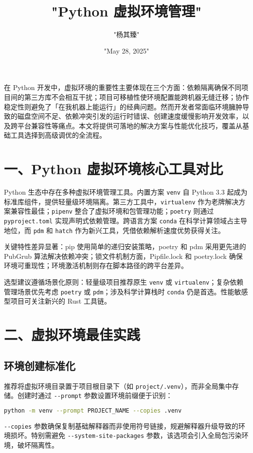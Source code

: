\title{"Python 虚拟环境管理"}
\author{"杨其臻"}
\date{"May 28, 2025"}
\maketitle
在 Python 开发中，虚拟环境的重要性主要体现在三个方面：依赖隔离确保不同项目间的第三方库不会相互干扰；项目可移植性使环境配置能跨机器无缝迁移；协作稳定性则避免了「在我机器上能运行」的经典问题。然而开发者常面临环境臃肿导致的磁盘空间不足、依赖冲突引发的运行时错误、创建速度缓慢影响开发效率，以及跨平台兼容性等痛点。本文将提供可落地的解决方案与性能优化技巧，覆盖从基础工具选择到高级调优的全流程。\par
\chapter{一、Python 虚拟环境核心工具对比}
Python 生态中存在多种虚拟环境管理工具。内置方案 \verb!venv! 自 Python 3.3 起成为标准库组件，提供轻量级环境隔离。第三方工具中，\verb!virtualenv! 作为老牌解决方案兼容性最佳；\verb!pipenv! 整合了虚拟环境和包管理功能；\verb!poetry! 则通过 \verb!pyproject.toml! 实现声明式依赖管理。跨语言方案 \verb!conda! 在科学计算领域占主导地位，而 \verb!pdm! 和 \verb!hatch! 作为新兴工具，凭借依赖解析速度优势获得关注。\par
关键特性差异显著：pip 使用简单的递归安装策略，poetry 和 pdm 采用更先进的 PubGrub 算法解决依赖冲突；锁文件机制方面，Pipfile.lock 和 poetry.lock 确保环境可重现性；环境激活机制则存在脚本路径的跨平台差异。\par
选型建议遵循场景化原则：轻量级项目推荐原生 \verb!venv! 或 \verb!virtualenv!；复杂依赖管理场景优先考虑 \verb!poetry! 或 \verb!pdm!；涉及科学计算栈时 \verb!conda! 仍是首选。性能敏感型项目可关注新兴的 Rust 工具链。\par
\chapter{二、虚拟环境最佳实践}
\section{环境创建标准化}
推荐将虚拟环境目录置于项目根目录下（如 \verb!project/.venv!），而非全局集中存储。创建时通过 \verb!--prompt! 参数设置环境前缀便于识别：\par
\begin{lstlisting}[language=bash]
python -m venv --prompt PROJECT_NAME --copies .venv
\end{lstlisting}
\verb!--copies! 参数确保复制基础解释器而非使用符号链接，规避解释器升级导致的环境损坏。特别需避免 \verb!--system-site-packages! 参数，该选项会引入全局包污染环境，破坏隔离性。\par
